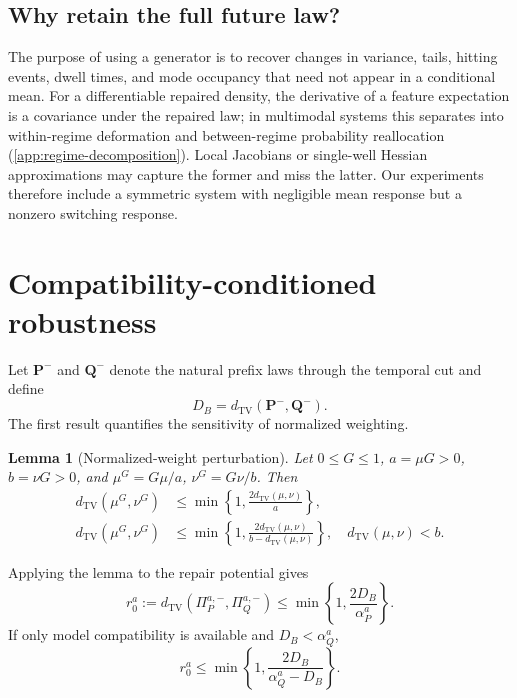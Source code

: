 \documentclass{article}
\newcommand{\TV}{d_{\mathrm{TV}}}
\newcommand{\PathP}{\mathbf P}
\newcommand{\PathQ}{\mathbf Q}
\newtheorem{lemma}[definition]{Lemma}
\theoremstyle{remark}
\begin{document}
\subsection{Why retain the full future law?}

The purpose of using a generator is to recover changes in variance, tails,
hitting events, dwell times, and mode occupancy that need not appear in a
conditional mean. For a differentiable repaired density, the derivative of a
feature expectation is a covariance under the repaired law; in multimodal
systems this separates into within-regime deformation and between-regime
probability reallocation (\cref{app:regime-decomposition}). Local Jacobians or
single-well Hessian approximations may capture the former and miss the latter.
Our experiments therefore include a symmetric system with negligible mean
response but a nonzero switching response.

\section{Compatibility-conditioned robustness}
\label{sec:robustness}

Let \(\PathP^-\) and \(\PathQ^-\) denote the natural prefix laws through the
temporal cut and define
\begin{equation}
  D_B=\TV(\PathP^-,\PathQ^-).
  \label{eq:prefix-error}
\end{equation}
The first result quantifies the sensitivity of normalized weighting.

\begin{lemma}[Normalized-weight perturbation]
\label{lem:weighted-tv}
Let \(0\leq G\leq1\), \(a=\mu G>0\), \(b=\nu G>0\), and
\(\mu^G=G\mu/a\), \(\nu^G=G\nu/b\). Then
\begin{align}
  \TV(\mu^G,\nu^G)
  &\leq
  \min\left\{1,\frac{2\TV(\mu,\nu)}{a}\right\},
  \label{eq:weighted-tv-true}\\
  \TV(\mu^G,\nu^G)
  &\leq
  \min\left\{1,
  \frac{2\TV(\mu,\nu)}{b-\TV(\mu,\nu)}
  \right\},
  \quad \TV(\mu,\nu)<b.
  \label{eq:weighted-tv-model}
\end{align}
\end{lemma}

Applying the lemma to the repair potential gives
\begin{equation}
  r_0^a
  :=
  \TV(\Pi_P^{a,-},\Pi_Q^{a,-})
  \leq
  \min\left\{1,\frac{2D_B}{\alpha_P^a}\right\}.
  \label{eq:repaired-prefix-error}
\end{equation}
If only model compatibility is available and \(D_B<\alpha_Q^a\),
\begin{equation}
  r_0^a
  \leq
  \min\left\{1,
  \frac{2D_B}{\alpha_Q^a-D_B}
  \right\}.
  \label{eq:observable-denominator}
\end{equation}
\end{document}
